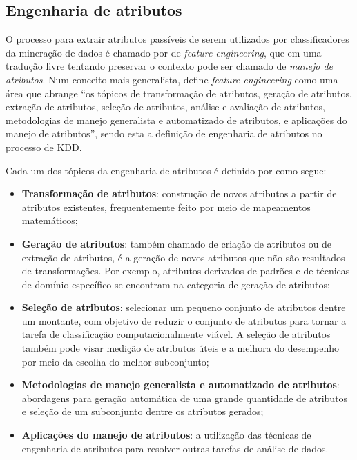     \subsection{Engenharia de atributos} \label{subsec:Engenharia-de-atributos}
        O processo para extrair atributos passíveis de serem utilizados por classificadores da mineração de dados é chamado por  de \textit{feature engineering}, que em uma tradução livre tentando preservar o contexto pode ser chamado de \textit{manejo de atributos}.
        Num conceito mais generalista,  define \textit{feature engineering} como uma área que abrange ``os tópicos de transformação de atributos, geração de atributos, extração de atributos, seleção de atributos, análise e avaliação de atributos, metodologias de manejo generalista e automatizado de atributos, e aplicações do manejo de atributos'', sendo esta a definição de engenharia de atributos no processo de KDD.
        
        Cada um dos tópicos da engenharia de atributos é definido por  como segue:
        \begin{itemize}
            \item \textbf{Transformação de atributos}: construção de novos atributos a partir de atributos existentes, frequentemente feito por meio de mapeamentos matemáticos;
            
            \item \textbf{Geração de atributos}: também chamado de criação de atributos ou de extração de atributos, é  a geração de novos atributos que não são resultados de transformações. Por exemplo, atributos derivados de padrões e de técnicas de domínio específico se encontram na categoria de geração de atributos;
            
            \item \textbf{Seleção de atributos}: selecionar um pequeno conjunto de atributos dentre um montante, com objetivo de reduzir o conjunto de atributos para tornar a tarefa de classificação computacionalmente viável. A seleção de atributos também pode visar medição de atributos úteis e a melhora do desempenho por meio da escolha do melhor subconjunto;
            
            \item \textbf{Metodologias de manejo generalista e automatizado de atributos}: abordagens para geração automática de uma grande quantidade de atributos e seleção de um subconjunto dentre os atributos gerados;
            
            \item \textbf{Aplicações do manejo de atributos}: a utilização das técnicas de engenharia de atributos para resolver outras tarefas de análise de dados.
        \end{itemize}

